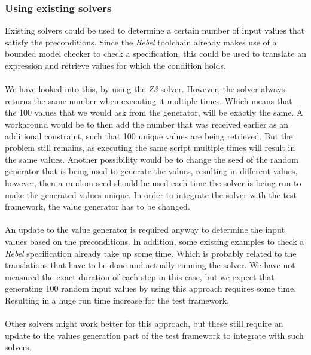 
\subsubsection{Using existing solvers}
Existing solvers could be used to determine a certain number of input values
that satisfy the preconditions. Since the \textit{Rebel} toolchain already makes
use of a bounded model checker to check a specification, this could be used to
translate an expression and retrieve values for which the condition holds.\\
\\
We have looked into this, by using the \textit{Z3} solver. However, the solver
always returns the same number when executing it multiple times. Which means
that the 100 values that we would ask from the generator, will be exactly the
same. A workaround would be to then add the number that was received earlier as
an additional constraint, such that 100 unique values are being retrieved. But
the problem still remains, as executing the same script multiple times will
result in the same values. Another possibility would be to change the seed of
the random generator that is being used to generate the values, resulting in
different values, however, then a random seed should be used each time the
solver is being run to make the generated values unique. In order to integrate
the solver with the test framework, the value generator has to be changed.\\
\\
An update to the value generator is required anyway to determine the input
values based on the preconditions. In addition, some existing examples to check
a \textit{Rebel} specification already take up some time. Which is probably
related to the translations that have to be done and actually running the
solver. We have not measured the exact duration of each step in this case, but
we expect that generating 100 random input values by using this approach
requires some time. Resulting in a huge run time increase for the test
framework.\\
\\
Other solvers might work better for this approach, but these still require an
update to the values generation part of the test framework to integrate with
such solvers.


%
